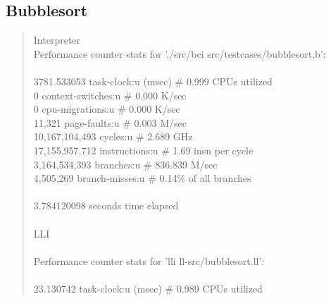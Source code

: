 \documentclass[12pt]{report}
\begin{document}
\subsection*{Bubblesort}

\begin{quote}
 Interpreter \\ 
 Performance counter stats for './src/bci src/testcases/bubblesort.b':                \\ 
                                                                                      \\ 
       3781.533053      task-clock:u (msec)       \#    0.999 CPUs utilized           \\ 
                 0      context-switches:u        \#    0.000 K/sec                   \\ 
                 0      cpu-migrations:u          \#    0.000 K/sec                   \\ 
            11,321      page-faults:u             \#    0.003 M/sec                   \\ 
    10,167,104,493      cycles:u                  \#    2.689 GHz                     \\ 
    17,155,957,712      instructions:u            \#    1.69  insn per cycle          \\ 
     3,164,534,393      branches:u                \#  836.839 M/sec                   \\ 
         4,505,269      branch-misses:u           \#    0.14\% of all branches        \\ 
                                                                                      \\ 
       3.784120098 seconds time elapsed                                               \\ 
                                                                                      \\ 
LLI                                                                                     \\ 
                                                                                      \\ 
 Performance counter stats for 'lli ll-src/bubblesort.ll':                            \\ 
                                                                                      \\ 
         23.130742      task-clock:u (msec)       \#    0.989 CPUs utilized           \\ 

\end{quote}
\end{document}

